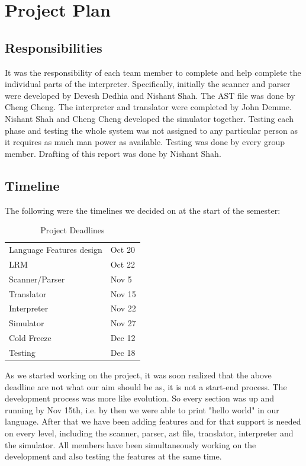 \documentclass[onecolumn,titlepage]{article}
\begin{document}
\section{Project Plan}

\subsection{Responsibilities}

It was the responsibility of each team member to complete and help
complete the individual parts of the interpreter. Specifically,
initially the scanner and parser were developed by Devesh Dedhia and
Nishant Shah. The AST file was done by Cheng Cheng. The interpreter
and translator were completed by John Demme. Nishant Shah and Cheng
Cheng developed the simulator together. Testing each phase and testing
the whole system was not assigned to any particular person as it
requires as much man power as available. Testing was done by every
group member.  Drafting of this report was done by Nishant Shah.

\subsection{Timeline}

The following were the timelines we decided on at the start of the
semester:

\begin{table}[h]
\caption{Project Deadlines}
\begin{center}
  \begin{tabular}{|l|l|}
    \hline
    Language Features design	& Oct 20 \\
    LRM				& Oct 22 \\
    Scanner/Parser		& Nov 5  \\
    Translator			& Nov 15 \\
    Interpreter			& Nov 22 \\
    Simulator			& Nov 27 \\
    Cold Freeze			& Dec 12 \\
    Testing                     & Dec 18 \\
    \hline
  \end{tabular}
\end{center}
\end{table}

As we started working on the project, it was soon realized that the
above deadline are not what our aim should be as, it is not a
start-end process. The development process was more like evolution. So
every section was up and running by Nov 15th, i.e. by then we were
able to print "hello world" in our language. After that we have been
adding features and for that support is needed on every level,
including the scanner, parser, ast file, translator, interpreter and
the simulator.  All members have been simultaneously working on the
development and also testing the features at the same time.
\end{document}

